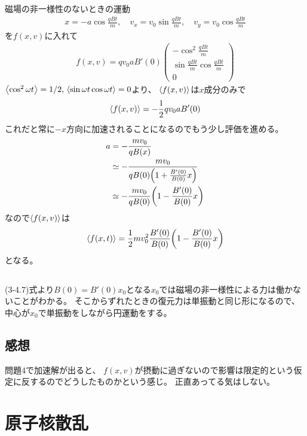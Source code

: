 \documentclass[../../master.tex]{subfiles}
\begin{document}
\subsection{}
磁場の非一様性のないときの運動
\begin{align}
    x = -a\cos\frac{qBt}{m},\quad v_x = v_0\sin\frac{qBt}{m},\quad v_y = v_0\cos\frac{qBt}{m}
\end{align}
を\(f(x,v)\)に入れて
\begin{align}
    f(x,v) = qv_0 aB'(0)\begin{pmatrix}
        -\cos^2\frac{qBt}{m}\\
        \sin\frac{qBt}{m}\cos\frac{qBt}{m}\\
        0
    \end{pmatrix}
\end{align}
\(\ev{\cos^2\omega t}=1/2,\,\ev{\sin\omega t\cos\omega t}=0\)より、
\(\ev{f(x,v)}\)は\(x\)成分のみで
\begin{align}
    \ev{f(x,v)} = -\frac{1}{2}qv_0a B'(0)
\end{align}
これだと常に\(-x\)方向に加速されることになるのでもう少し評価を進める。
\begin{align}
    a &= - \frac{mv_0}{qB(x)} \\
    &\simeq -\dfrac{mv_0}{qB(0)\qty(1+\frac{B'(0)}{B(0)}x)}\\
    &\simeq -\frac{mv_0}{qB(0)}\qty(1-\frac{B'(0)}{B(0)}x)
\end{align}
なので\(\ev{f(x,v)}\)は
\begin{align}
    \ev{f(x,t)} = \frac{1}{2}mv_0^2 \frac{B'(0)}{B(0)}\qty(1-\frac{B'(0)}{B(0)}x)
\end{align}
となる。
\subsection{}
(3-4.7)式より\(B(0)=B'(0)x_0\)となる\(x_0\)では磁場の非一様性による力は働かないことがわかる。
そこからずれたときの復元力は単振動と同じ形になるので、
中心が\(x_0\)で単振動をしながら円運動をする。

\subsection*{感想}
問題4で加速解が出ると、
\(f(x,v)\)が摂動に過ぎないので影響は限定的という仮定に反するのでどうしたものかという感じ。
正直あってる気はしない。

\clearpage
\section{原子核散乱}
\end{document}
